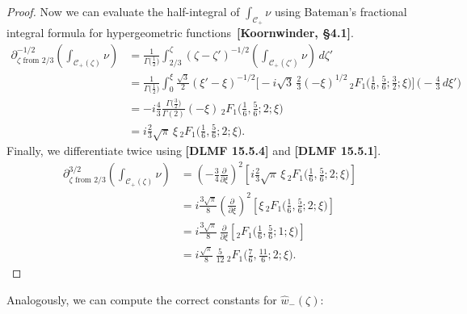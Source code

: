 \documentclass{article}
\begin{document}
\begin{proof}
Now we can evaluate the half-integral of $\int_{\mathcal{C}_+} \nu$ using Bateman's fractional integral formula for hypergeometric functions~\textbf{[Koornwinder, \S 4.1]}.
\begin{align*}
\partial^{-1/2}_{\zeta \text{ from } 2/3} \left( \int_{\mathcal{C}_+(\zeta)} \nu \right) & = \frac{1}{\Gamma\big(\tfrac{1}{2}\big)} \int_{2/3}^\zeta (\zeta - \zeta')^{-1/2} \left( \int_{\mathcal{C}_+(\zeta')} \nu \right)\,d\zeta' \\
& = \frac{1}{\Gamma\big(\tfrac{1}{2}\big)} \int_0^\xi \tfrac{\sqrt{3}}{2} (\xi' - \xi)^{-1/2} \Big[ -{i}{\sqrt{3}}\,\tfrac{2}{3} (-\xi)^{1/2}\,{}_2F_1\big(\tfrac{1}{6}, \tfrac{5}{6}; \tfrac{3}{2}; \xi\big) \Big] \,\big( -\tfrac{4}{3}\,d\xi' \big) \\
& = -i \frac{4}{3} \frac{\Gamma\big(\tfrac{3}{2}\big)}{\Gamma(2)} (-\xi)\,{}_2F_1\big(\tfrac{1}{6}, \tfrac{5}{6}; 2; \xi\big) \\
& = i \frac{2}{3} \sqrt{\pi}\,\xi\, {}_2F_1\big(\tfrac{1}{6}, \tfrac{5}{6}; 2; \xi\big).
\end{align*}
Finally, we differentiate twice using \textbf{[DLMF 15.5.4]} and \textbf{[DLMF 15.5.1]}.
\begin{align*}
\partial^{3/2}_{\zeta \text{ from } 2/3} \left( \int_{\mathcal{C}_+(\zeta)} \nu \right) & = \left(-\tfrac{3}{4} \tfrac{\partial}{\partial \xi}\right)^2 \left[ i \frac{2}{3} \sqrt{\pi}\,\xi\, {}_2F_1\big(\tfrac{1}{6}, \tfrac{5}{6}; 2; \xi\big) \right] \\
& = i \tfrac{3\sqrt{\pi}}{8} \left(\tfrac{\partial}{\partial \xi}\right)^2 \left[ \xi\,{}_2F_1\big(\tfrac{1}{6}, \tfrac{5}{6}; 2; \xi\big) \right] \\
& = i \tfrac{3\sqrt{\pi}}{8}\,\tfrac{\partial}{\partial \xi} \left[ {}_2F_1\big(\tfrac{1}{6}, \tfrac{5}{6}; 1; \xi\big) \right] \\
& = i \tfrac{\sqrt{\pi}}{8}\,\tfrac{5}{12}\, {}_2F_1\big(\tfrac{7}{6}, \tfrac{11}{6}; 2; \xi\big).
\end{align*}
\end{proof}
Analogously, we can compute the correct constants for $\hat{w}_-(\zeta)$:
\end{document}
